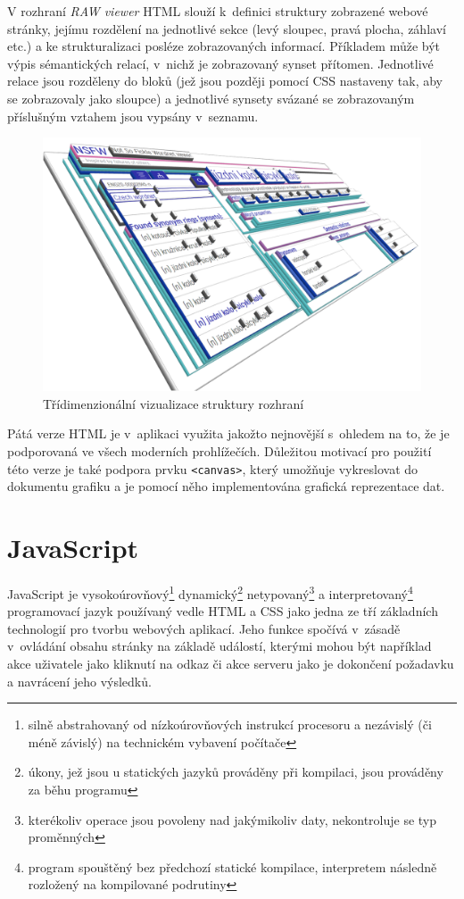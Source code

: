 \documentclass[a4paper, 11pt, oneside, showtrims]{book}
\newcommand{\simplywn}{\textit{RAW viewer} }
\begin{document}
				V rozhraní \simplywn HTML slouží k~definici struktury zobrazené webové stránky, jejímu rozdělení na jednotlivé sekce (levý sloupec, pravá plocha, záhlaví etc.) a ke strukturalizaci posléze zobrazovaných informací. Příkladem může být výpis sémantických relací, v~nichž je zobrazovaný synset přítomen. Jednotlivé relace jsou rozděleny do bloků (jež jsou později pomocí CSS nastaveny tak, aby se zobrazovaly jako sloupce) a jednotlivé synsety svázané se zobrazovaným příslušným vztahem jsou vypsány v~seznamu. 

				\begin{figure}[h]
					\centering
					\includegraphics[width=1.0\textwidth]{html3d2.png}
					\caption{Třídimenzionální vizualizace struktury rozhraní}
					\label{fig:html3d}
				\end{figure}

				Pátá verze HTML je v~aplikaci využita jakožto nejnovější s~ohledem na to, že je podporovaná ve všech moderních prohlížečích. \parencite{html5support} Důležitou motivací pro použití této verze je také podpora prvku \texttt{<canvas>}, který umožňuje vykreslovat do dokumentu grafiku \parencite{w3schools2017htmlcanvas} a je pomocí něho implementována grafická reprezentace dat. 

			\section{JavaScript}

				JavaScript je vysokoúrovňový\footnote{silně abstrahovaný od nízkoúrovňových instrukcí procesoru a nezávislý (či méně závislý) na technickém vybavení počítače} dynamický\footnote{úkony, jež jsou u statických jazyků prováděny při kompilaci, jsou prováděny za běhu programu} netypovaný\footnote{kterékoliv operace jsou povoleny nad jakýmikoliv daty, nekontroluje se typ proměnných} a interpretovaný\footnote{program spouštěný bez předchozí statické kompilace, interpretem následně rozložený na kompilované podrutiny} programovací jazyk používaný vedle HTML a CSS jako jedna ze tří základních technologií pro tvorbu webových aplikací. Jeho funkce spočívá v~zásadě v~ovládání obsahu stránky na základě událostí, kterými mohou být například akce uživatele jako kliknutí na odkaz či akce serveru jako je dokončení požadavku a navrácení jeho výsledků.%
\end{document}
